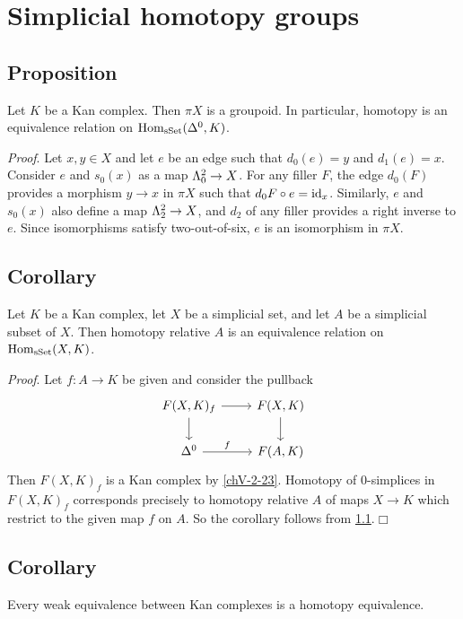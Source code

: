 \section{Simplicial homotopy groups}\label{chV-3}
    \subsection{Proposition}\label{chV-3-1}
        Let $K$ be a Kan complex. Then $\pi X$ is a groupoid. In particular, homotopy is an equivalence relation on $\operatorname{Hom}_{\operatorname{sSet}}(\Delta^0, K)$.
        \smallskip

        \emph{Proof}. Let $x, y \in X$ and let $e$ be an edge such that $d_0(e) = y$ and $d_1(e) = x$. Consider $e$ and $s_0(x)$ as a map $\Lambda^{2}_{0} \to X$. For any filler $F$, the edge $d_0(F)$ provides a morphism $y \to x$ in $\pi X$ such that $d_0F \circ e = \operatorname{id}_x$. Similarly, $e$ and $s_0(x)$ also define a map $\Lambda^{2}_{2} \to X$, and $d_2$ of any filler provides a right inverse to $e$. Since isomorphisms satisfy two-out-of-six, $e$ is an isomorphism in $\pi X$.

    \subsection{Corollary}\label{chV-3-2}
        Let $K$ be a Kan complex, let $X$ be a simplicial set, and let $A$ be a simplicial subset of $X$. Then homotopy relative $A$ is an equivalence relation on $\operatorname{Hom}_{\operatorname{sSet}}(X, K)$.
        \smallskip

        \emph{Proof}. Let $f \colon A \to K$ be given and consider the pullback
        \begin{equation*}
            \begin{tikzcd}
                F(X, K)_f \arrow[d] \arrow[r] & F(X, K) \arrow[d] \\
                \Delta^0 \arrow[r, "f"] & F(A, K)
            \end{tikzcd}
        \end{equation*}
        Then $F(X, K)_f$ is a Kan complex by \ref{chV-2-23}. Homotopy of $0$-simplices in $F(X, K)_f$ corresponds precisely to homotopy relative $A$ of maps $X \to K$ which restrict to the given map $f$ on $A$. So the corollary follows from \ref{chV-3-1}.\hfill$\Box$

    \subsection{Corollary}\label{chV-3-3}
        Every weak equivalence between Kan complexes is a homotopy equivalence.
        \smallskip

